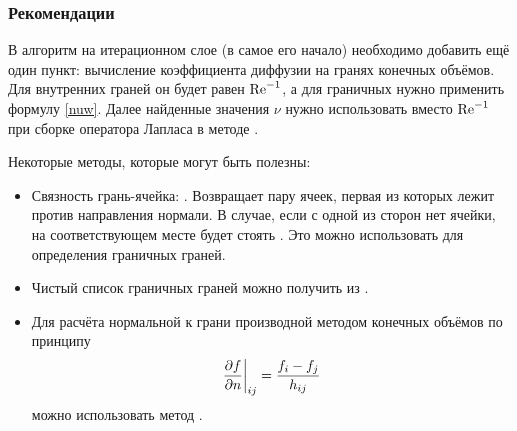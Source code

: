 \subsubsection{Рекомендации}
В алгоритм на итерационном слое (в самое его начало) необходимо добавить ещё один пункт:
вычисление коэффициента диффузии на гранях конечных объёмов.
Для внутренних граней он будет равен $\mathrm{Re}^{-1}$,
а для граничных нужно применить формулу \cref{nuw}.
Далее найденные значения $\nu$ нужно использовать
вместо $\mathrm{Re}^{-1}$ при сборке оператора Лапласа
в методе .

Некоторые методы, которые могут быть полезны:
\begin{itemize}
\item Связность грань-ячейка: . Возвращает пару ячеек, первая из которых лежит против направления нормали.
      В случае, если с одной из сторон нет ячейки, на соответствующем месте будет стоять .
      Это можно использовать для определения граничных граней.
\item Чистый список граничных граней можно получить из .
\item Для расчёта нормальной к грани производной методом конечных объёмов по принципу
      $$\left.\frac{\partial f}{\partial n}\right|_{ij} = \frac{f_{i} - f_{j}}{h_{ij}}$$
      можно использовать метод .
\end{itemize}
